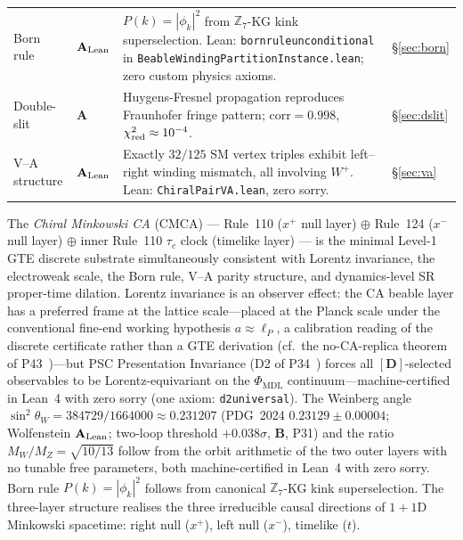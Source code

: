 \documentclass[11pt]{article}
\theoremstyle{remark}
\newcommand{\PHIMDL}{\Phi_{\mathrm{MDL}}}
\newcommand{\ZS}{\mathbb{Z}_7}
\newcommand{\lean}[1]{%
  \penalty-100
  \begingroup\def\_{\textunderscore\allowbreak}\texttt{#1}\endgroup}
\newcommand{\sinwsq}{\sin^2\!\theta_W}
\newcommand{\CatA}{\textbf{A}}
\newcommand{\CatAL}{\ensuremath{\textbf{A}_{\rm Lean}}}
\newcommand{\CatB}{\textbf{B}}
\begin{document}
\begin{longtable}{@{}>{\raggedright\arraybackslash}p{2.8cm}>{\raggedright\arraybackslash}p{1.4cm}>{\raggedright\arraybackslash}p{8.8cm}>{\raggedright\arraybackslash}p{2.2cm}@{}}
Born rule & $\CatAL$ &
  $P(k)=|\phi_k|^2$ from $\ZS$-KG kink superselection.
  Lean: \lean{born\_rule\_unconditional} in
  \lean{BeableWindingPartitionInstance.lean}; zero custom physics axioms. &
  \S\ref{sec:born}\\
Double-slit & $\CatA$ &
  Huygens-Fresnel propagation reproduces Fraunhofer fringe pattern;
  $\mathrm{corr}=0.998$, $\chi^2_{\rm red}\approx10^{-4}$.&
  \S\ref{sec:dslit}\\
V--A structure & $\CatAL$ &
  Exactly $32/125$ SM vertex triples exhibit left--right winding mismatch,
  all involving $W^+$.  Lean: \lean{ChiralPairVA.lean}, zero sorry. &
  \S\ref{sec:va}\\
\end{longtable}
\normalsize
\renewcommand{\arraystretch}{1}

\medskip

\begin{tcolorbox}[colback=green!4,colframe=green!45!black,
  title={\textbf{Central result}},
  fonttitle=\bfseries,left=6pt,right=6pt,top=4pt,bottom=4pt]
\small
The \emph{Chiral Minkowski CA} (CMCA) --- Rule~110 ($x^+$ null layer) $\oplus$
Rule~124 ($x^-$ null layer) $\oplus$ inner Rule~110 $\tau_c$ clock (timelike
layer) --- is the minimal Level-1 GTE discrete substrate simultaneously
consistent with Lorentz invariance, the electroweak scale, the Born rule,
V--A parity structure, and dynamics-level SR proper-time dilation.
Lorentz invariance is an observer effect: the CA beable layer has a preferred
frame at the lattice scale---placed at the Planck scale under the conventional
fine-end working hypothesis $a\approx\ell_P$, a calibration reading of
the discrete certificate rather than a GTE derivation
(cf.\ the no-CA-replica theorem of P43~\cite{SpivackCompleteness})---but
PSC Presentation Invariance (D2 of
P34~\cite{SpivackGTEMobius}) forces all $[\mathbf{D}]$-selected observables to
be Lorentz-equivariant on the $\PHIMDL$ continuum---machine-certified in Lean~4
with zero sorry (one axiom: \lean{d2\_universal}).
The Weinberg angle $\sinwsq=384729/1664000\approx0.231207$
(PDG~2024 $0.23129\pm0.00004$; Wolfenstein \CatAL; two-loop threshold $+0.038\sigma$, \CatB, P31) and the ratio $M_W/M_Z=\sqrt{10/13}$ follow from the
orbit arithmetic of the two outer layers with no tunable free parameters,
both machine-certified in Lean~4 with zero sorry.
Born rule $P(k)=|\phi_k|^2$ follows from canonical $\ZS$-KG kink superselection.
The three-layer structure realises the three irreducible causal directions of
$1+1$D Minkowski spacetime: right null ($x^+$), left null ($x^-$), timelike ($t$).
\end{tcolorbox}
\end{document}
